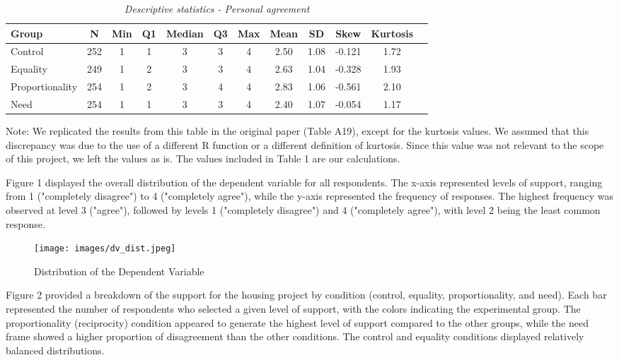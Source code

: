\documentclass[titlepage]{article}
\begin{document}
\begin{table}[H]
    \centering
    \caption{\textit{Descriptive statistics - Personal agreement}}
    \begin{tabular}{lccccccccccc}  
        \toprule
        \textbf{Group} & \textbf{N} & \textbf{Min} & \textbf{Q1} & \textbf{Median} & \textbf{Q3} & \textbf{Max} & \textbf{Mean} & \textbf{SD} & \textbf{Skew} & \textbf{Kurtosis} \\
        \midrule
        Control        & 252 & 1 & 1 & 3 & 3 & 4 & 2.50 & 1.08 & -0.121 & 1.72 \\
        Equality       & 249 & 1 & 2 & 3 & 3 & 4 & 2.63 & 1.04 & -0.328 & 1.93 \\
        Proportionality & 254 & 1 & 2 & 3 & 4 & 4 & 2.83 & 1.06 & -0.561 & 2.10 \\
        Need          & 254 & 1 & 1 & 3 & 3 & 4 & 2.40 & 1.07 & -0.054 & 1.17 \\
        \bottomrule
    \end{tabular}
\end{table}

\justify
Note: We replicated the results from this table in the original paper (Table A19), except for the kurtosis values. We assumed that this discrepancy was due to the use of a different R function or a different definition of kurtosis. Since this value was not relevant to the scope of this project, we left the values as is. The values included in Table 1 are our calculations.

\justify
Figure 1 displayed the overall distribution of the dependent variable for all respondents. The x-axis represented levels of support, ranging from 1 ("completely disagree") to 4 ("completely agree"), while the y-axis represented the frequency of responses. The highest frequency was observed at level 3 ("agree"), followed by levels 1 ("completely disagree") and 4 ("completely agree"), with level 2 being the least common response.

\begin{figure}[H]
    \centering
    \texttt{[image: images/dv\_dist.jpeg]}
    \caption{Distribution of the Dependent Variable}
    \label{fig:dv}
\end{figure}

\justify
Figure 2 provided a breakdown of the support for the housing project by condition (control, equality, proportionality, and need). Each bar represented the number of respondents who selected a given level of support, with the colors indicating the experimental group. The proportionality (reciprocity) condition appeared to generate the highest level of support compared to the other groups, while the need frame showed a higher proportion of disagreement than the other conditions. The control and equality conditions displayed relatively balanced distributions.
\end{document}
